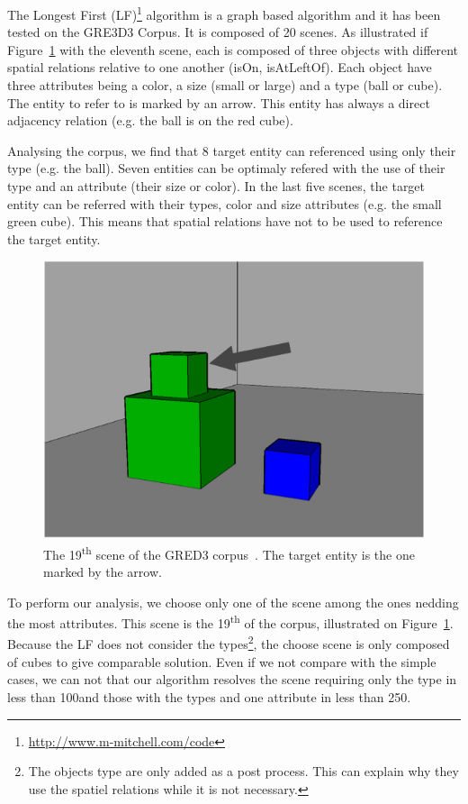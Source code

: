 The Longest First (LF)\footnote{\url{http://www.m-mitchell.com/code}} algorithm \cite{viethen_2013_graphs} is a graph based algorithm and it has been tested on the GRE3D3 Corpus. It is composed of 20 scenes. As illustrated if Figure~\ref{fig:chap4_gred3} with the eleventh scene, each is composed of three objects with different spatial relations relative to one another (isOn, isAtLeftOf). Each object have three attributes being a color, a size (small or large) and a type (ball or cube). The entity to refer to is marked by an arrow. This entity has always a direct adjacency relation (e.g. the ball is on the red cube).

Analysing the corpus, we find that 8 target entity can referenced using only their type (e.g. the ball). Seven entities can be optimaly refered with the use of their type and an attribute (their size or color). In the last five scenes, the target entity can be referred with their types, color and size attributes (e.g. the small green cube). This means that spatial relations have not to be used to reference the target entity. 

\begin{figure}[h!]
\centering
\includegraphics[scale=0.3]{figures/chapter4/GRED3.jpg}
\caption{\label{fig:chap4_gred3} The 19\textsuperscript{th} scene of the GRED3 corpus~\cite{dale_2009_referring}. The target entity is the one marked by the arrow.}
\end{figure}

To perform our analysis, we choose only one of the scene among the ones nedding the most attributes. This scene is the 19\textsuperscript{th} of the corpus, illustrated on Figure~\ref{fig:chap4_gred3}. Because the LF does not consider the types\footnote{The objects type are only added as a post process. This can explain why they use the spatiel relations while it is not necessary.}, the choose scene is only composed of cubes to give comparable solution. Even if we not compare with the simple cases, we can not that our algorithm resolves the scene requiring only the type in less than 100\us and those with the types and one attribute in less than 250\us.

